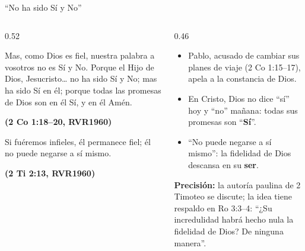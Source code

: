 \documentclass[hyperref={bookmarks=false},aspectratio=169]{beamer}
\newcommand{\fuente}[1]{\par\hfill{\upshape\bfseries\footnotesize\textcolor{azul}{#1}}}
\newcommand{\destacar}[1]{\textbf{\textcolor{azul}{#1}}}
\newcommand{\precision}[1]{{\footnotesize\color{gris}\textbf{Precisión:} #1}}
\begin{document}
\begin{frame}{``No ha sido Sí y No''}
\begin{columns}[t,onlytextwidth]
\begin{column}{0.52\textwidth}
\begin{cita}Mas, como Dios es fiel, nuestra palabra a vosotros no es Sí y No. Porque el Hijo de Dios, Jesucristo\ldots{} no ha sido Sí y No; mas ha sido Sí en él; porque todas las promesas de Dios son en él Sí, y en él Amén.\fuente{(2 Co 1:18--20, RVR1960)}\end{cita}
\begin{cita}Si fuéremos infieles, él permanece fiel; él no puede negarse a sí mismo.\fuente{(2 Ti 2:13, RVR1960)}\end{cita}
\end{column}
\begin{column}{0.46\textwidth}\small
\begin{itemize}
\item Pablo, acusado de cambiar sus planes de viaje (2 Co 1:15--17), apela a la constancia de Dios.
\item En Cristo, Dios no dice ``sí'' hoy y ``no'' mañana: todas sus promesas son ``\destacar{Sí}''.
\item ``No puede negarse a sí mismo'': la fidelidad de Dios descansa en su \destacar{ser}.
\end{itemize}
\precision{la autoría paulina de 2 Timoteo se discute; la idea tiene respaldo en Ro 3:3--4: ``¿Su incredulidad habrá hecho nula la fidelidad de Dios? De ninguna manera''.}
\end{column}
\end{columns}
\end{frame}
\end{document}
